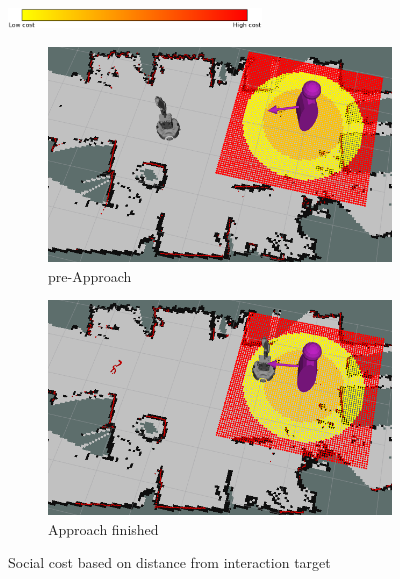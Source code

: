 \documentclass[a4paper,11pt]{report}
\begin{document}
\begin{figure}
    \centering
    \includegraphics[width=0.6\textwidth]{figures/colour_bar.png}
    \begin{subfigure}[b]{0.45\textwidth}
        \includegraphics[width=\textwidth]{figures/cost_function_1.png}
        \caption{pre-Approach}
        \label{fig:cost_function_1}
    \end{subfigure}
    \begin{subfigure}[b]{0.45\textwidth}
        \includegraphics[width=\textwidth]{figures/cost_function_2.png}
        \caption{Approach finished}
        \label{fig:cost_function_2}
    \end{subfigure}   
    \caption{Social cost based on distance from interaction target}
    \label{fig:cost_function}
\end{figure}
\end{document}
